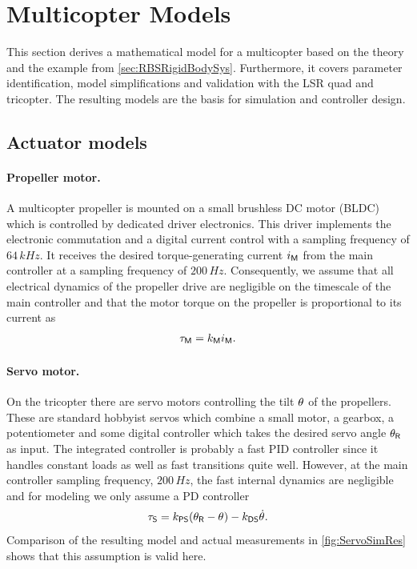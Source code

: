 \section{Multicopter Models}\label{sec:RealizationModels}
This section derives a mathematical model for a multicopter based on the theory and the example from \autoref{sec:RBSRigidBodySys}.
Furthermore, it covers parameter identification, model simplifications and validation with the LSR quad and tricopter.
The resulting models are the basis for simulation and controller design. 

\subsection{Actuator models}

\paragraph{Propeller motor.}
A multicopter propeller is mounted on a small brushless DC motor (BLDC) which is controlled by dedicated driver electronics.
This driver implements the electronic commutation and a digital current control with a sampling frequency of $64\,\unit{kHz}$.
It receives the desired torque-generating current $i_{\mathsf{M}}$ from the main controller at a sampling frequency of $200\,\unit{Hz}$.
Consequently, we assume that all electrical dynamics of the propeller drive are negligible on the timescale of the main controller and that the motor torque on the propeller is proportional to its current as
\begin{align}
 \tau_{\mathsf{M}} = k_{\mathsf{M}} i_{\mathsf{M}}.
\end{align}

\paragraph{Servo motor.}
On the tricopter there are servo motors controlling the tilt $\theta_{}$ of the propellers.
These are standard hobbyist servos which combine a small motor, a gearbox, a potentiometer and some digital controller which takes the desired servo angle $\theta_{\mathsf{R}}$ as input.
The integrated controller is probably a fast PID controller since it handles constant loads as well as fast transitions quite well.
However, at the main controller sampling frequency, $200\,\unit{Hz}$, the fast internal dynamics are negligible and for modeling we only assume a PD controller
\begin{align}
 \tau_{\mathsf{S}} = k_{\mathsf{PS}} (\theta_{\mathsf{R}} - \theta_{}) - k_{\mathsf{DS}} \dot{\theta}_{}.
\end{align}
Comparison of the resulting model and actual measurements in \autoref{fig:ServoSimRes} shows that this assumption is valid here.

